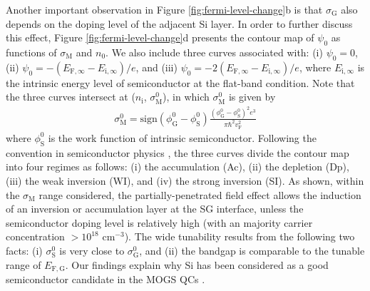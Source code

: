 \documentclass[journal=nalefd]{achemso}
\newcommand*\subs[1]{_{\text{#1}}} %
\begin{document}
Another important observation in Figure \ref{fig:fermi-level-change}b is that $\sigma\subs{G}$ also depends on the doping level of the adjacent Si layer.
In order to further discuss this effect, Figure \ref{fig:fermi-level-change}d presents the contour map of $\psi_0$   as functions of $\sigma\subs{M}$ and $n_0$. 
We also include three curves associated with: (i) $\psi_0=0$, (ii) $\psi_0= -( E_{\mathrm F,\infty} - E_{\mathrm i,\infty})/e$, and (iii) $\psi_0 = -2(E_{\mathrm F,\infty} - E_{\mathrm i,\infty})/e$, where $E_{\mathrm i,\infty}$ is the intrinsic energy level of semiconductor at the flat-band condition.
Note that the three curves intersect at ($n\subs{i}$, $\sigma\subs{M}^0$), in which $\sigma\subs{M}^0$ is given by
\begin{align}
    \sigma\subs{M}^0 = \mathrm{sign}(\phi\subs{G}^0-\phi\subs{S}^0)\frac{(\phi\subs{G}^0-\phi\subs{S}^0)^2 e^3}{\pi \hbar^2 v\subs{F}^2}
\end{align}
where $\phi\subs{S}^0$ is the work function of intrinsic semiconductor. 
Following the convention in semiconductor physics \cite{Sze2006Mosfets}, the three curves divide the contour map into four regimes as follows: (i) the accumulation (Ac), (ii) the depletion (Dp), (iii) the weak inversion (WI), and (iv) the strong inversion (SI). 
As shown, within the $\sigma\subs{M}$ range considered, the partially-penetrated field effect allows the induction of an inversion or accumulation layer at the SG interface, unless the semiconductor doping level is relatively high (with an majority carrier concentration $> 10^{18}$ cm$^{-3}$).
The wide tunability results from the following two facts: (i) $\sigma\subs{S}^0$ is very close to $\sigma\subs{G}^0$, and (ii) the bandgap is comparable to the tunable range of $E_{\mathrm {F,G}}$. 
Our findings explain why Si has been considered as a good semiconductor candidate in the MOGS QCs \cite{Yang2012Graphene, Regan2012ScreeningEngineered}.


\end{document}
